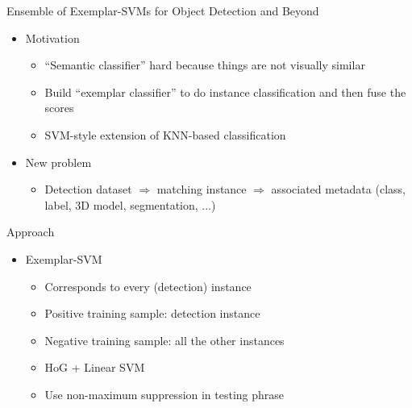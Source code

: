 \documentclass[12pt]{beamer}
\begin{document}
\begin{frame}{Ensemble of Exemplar-SVMs for Object Detection and Beyond}
	\begin{itemize}
		\item Motivation
		\begin{itemize}
			\item ``Semantic classifier'' hard because things are not visually similar
			\item Build ``exemplar classifier'' to do instance classification and then fuse the scores
			\item SVM-style extension of KNN-based classification
		\end{itemize}
		\item New problem
		\begin{itemize}
			\item Detection dataset $\Rightarrow$ matching instance $\Rightarrow$ associated metadata (class, label, 3D model, segmentation, ...)
		\end{itemize}
	\end{itemize}
\end{frame}

\begin{frame}{Approach}
	\begin{itemize}
		\item Exemplar-SVM
		\begin{itemize}
			\item Corresponds to every (detection) instance
			\item Positive training sample: detection instance
			\item Negative training sample: all the other instances
			\item HoG + Linear SVM
			\item Use non-maximum suppression in testing phrase
		\end{itemize}
	\end{itemize}
\end{frame}
\end{document}
